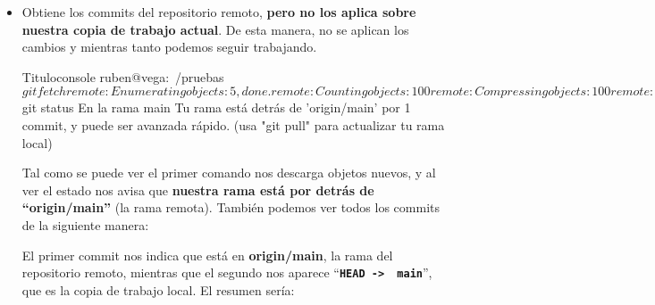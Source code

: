 \begin{itemize}
    \item {}

    Obtiene los commits del repositorio remoto, \textbf{pero no los aplica sobre nuestra copia de trabajo actual}. De esta manera, no se aplican los cambios y mientras tanto podemos seguir trabajando.

\begin{mycode}{Titulo}{console}{}
ruben@vega:~/pruebas$ git fetch
remote: Enumerating objects: 5, done.
remote: Counting objects: 100%
remote: Compressing objects: 100%
remote: Total 3 (delta 0), reused 3 (delta 0), pack-reused 0
Desempaquetando objetos: 100%
Desde github.com:yuki/pruebas
2cac944..97f5359  main       -> origin/main

ruben@vega:~/pruebas$ git status
En la rama main
Tu rama está detrás de 'origin/main' por 1 commit, y puede ser
avanzada rápido. (usa "git pull" para actualizar tu rama local)
\end{mycode}

    Tal como se puede ver el primer comando nos descarga objetos nuevos, y al ver el estado nos avisa que \textbf{nuestra rama está por detrás de “origin/main”} (la rama remota). También podemos ver todos los commits de la siguiente manera:


    El primer commit nos indica que está en \textbf{origin/main}, la rama del repositorio remoto, mientras que el segundo  nos aparece “\textbf{\texttt{HEAD -> \ main}}”, que es la copia de trabajo local. El resumen sería:


\end{itemize}
